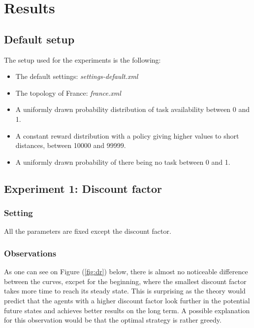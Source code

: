 \documentclass[11pt]{article}
\begin{document}
\section{Results}

\subsection{Default setup}

The setup used for the experiments is the following:
\begin{itemize}
    \item The default settings: \textit{settings-default.xml}
    \item The topology of France: \textit{france.xml}
    \item A uniformly drawn probability distribution of task availability between 0 and 1.
    \item A constant reward distribution with a policy giving higher values to short distances, between 10000 and 99999.
    \item A uniformly drawn probability of there being no task between 0 and 1.
\end{itemize}


\subsection{Experiment 1: Discount factor}

\subsubsection{Setting}
All the parameters are fixed except the discount factor.

\subsubsection{Observations}

As one can see on Figure (\ref{fig:dr}) below, there is almost no noticeable difference between the curves, excpet for the beginning, where the smallest discount factor takes more time to reach its steady state. This is surprising as the theory would predict that the agents with a higher discount factor look further in the potential future states and achieves better results on the long term. A possible explanation for this observation would be that the optimal strategy is rather greedy.
\end{document}
